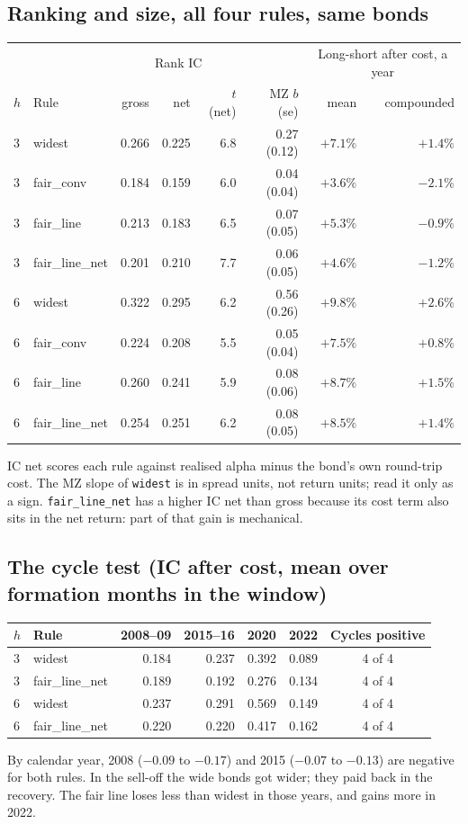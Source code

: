 \documentclass[11pt,a4paper]{article}
\newcommand{\code}[1]{\texttt{\small #1}}
\begin{document}
\subsection*{Ranking and size, all four rules, same bonds}
\begin{center}
{\small\begin{tabular}{@{}llrrrrrr@{}}\toprule
 & & \multicolumn{3}{c}{Rank IC} & & \multicolumn{2}{c}{Long-short after cost, a year} \\
$h$ & Rule & gross & net & $t$ (net) & MZ $b$ (se) & mean & compounded \\\midrule
3 & widest        & 0.266 & 0.225 & 6.8 & 0.27 (0.12) & $+7.1\%$ & $+1.4\%$ \\
3 & fair\_conv    & 0.184 & 0.159 & 6.0 & 0.04 (0.04) & $+3.6\%$ & $-2.1\%$ \\
3 & fair\_line    & 0.213 & 0.183 & 6.5 & 0.07 (0.05) & $+5.3\%$ & $-0.9\%$ \\
3 & fair\_line\_net & 0.201 & 0.210 & 7.7 & 0.06 (0.05) & $+4.6\%$ & $-1.2\%$ \\\midrule
6 & widest        & 0.322 & 0.295 & 6.2 & 0.56 (0.26) & $+9.8\%$ & $+2.6\%$ \\
6 & fair\_conv    & 0.224 & 0.208 & 5.5 & 0.05 (0.04) & $+7.5\%$ & $+0.8\%$ \\
6 & fair\_line    & 0.260 & 0.241 & 5.9 & 0.08 (0.06) & $+8.7\%$ & $+1.5\%$ \\
6 & fair\_line\_net & 0.254 & 0.251 & 6.2 & 0.08 (0.05) & $+8.5\%$ & $+1.4\%$ \\\bottomrule
\end{tabular}}
\end{center}
\noindent IC net scores each rule against realised alpha minus the bond's own round-trip cost. The MZ slope of \code{widest} is in spread units, not return units; read it only as a sign. \code{fair\_line\_net} has a higher IC net than gross because its cost term also sits in the net return: part of that gain is mechanical.

\subsection*{The cycle test (IC after cost, mean over formation months in the window)}
\begin{center}
\begin{tabular}{@{}llrrrrc@{}}\toprule
$h$ & Rule & 2008--09 & 2015--16 & 2020 & 2022 & Cycles positive \\\midrule
3 & widest         & 0.184 & 0.237 & 0.392 & 0.089 & 4 of 4 \\
3 & fair\_line\_net & 0.189 & 0.192 & 0.276 & 0.134 & 4 of 4 \\
6 & widest         & 0.237 & 0.291 & 0.569 & 0.149 & 4 of 4 \\
6 & fair\_line\_net & 0.220 & 0.220 & 0.417 & 0.162 & 4 of 4 \\\bottomrule
\end{tabular}
\end{center}
By calendar year, 2008 ($-0.09$ to $-0.17$) and 2015 ($-0.07$ to $-0.13$) are negative for both rules. In the sell-off the wide bonds got wider; they paid back in the recovery. The fair line loses less than widest in those years, and gains more in 2022.
\end{document}
